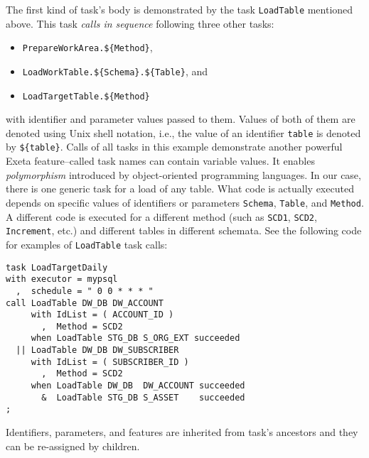 \documentclass[a4paper,12pt,english,oneside]{book}
\newcommand{\exeta}{Exeta\xspace}
\begin{document}
The first kind of task's body is demonstrated by the task \verb|LoadTable| mentioned above. This task \emph{calls in sequence} following three other tasks:
\begin{itemize}
\item \verb|PrepareWorkArea.${Method}|,
\item \verb|LoadWorkTable.${Schema}.${Table}|, and
\item \verb|LoadTargetTable.${Method}|
\end{itemize}
with identifier and parameter values passed to them. Values of both of them are denoted using Unix shell notation, i.e., the value of an identifier \verb|table| is denoted by \verb|${table}|. Calls of all tasks in this example demonstrate another powerful \exeta feature--called task names can contain variable values. It enables \emph{polymorphism} introduced by object-oriented programming languages. In our case, there is one generic task for a load of any table. What code is actually executed depends on specific values of identifiers or parameters \verb|Schema|, \verb|Table|, and  \verb|Method|. A different code is executed for a different method (such as \verb|SCD1|, \verb|SCD2|, \verb|Increment|, etc.) and different tables in different schemata. See the following code for examples of \verb|LoadTable| task calls:
\begin{verbatim}
task LoadTargetDaily
with executor = mypsql
  ,  schedule = " 0 0 * * * "
call LoadTable DW_DB DW_ACCOUNT
     with IdList = ( ACCOUNT_ID )
       ,  Method = SCD2
     when LoadTable STG_DB S_ORG_EXT succeeded
  || LoadTable DW_DB DW_SUBSCRIBER
     with IdList = ( SUBSCRIBER_ID )
       ,  Method = SCD2
     when LoadTable DW_DB  DW_ACCOUNT succeeded
       &  LoadTable STG_DB S_ASSET    succeeded
;
\end{verbatim}
Identifiers, parameters, and features are inherited from task's ancestors and they can be re-assigned by children.

\end{document}
